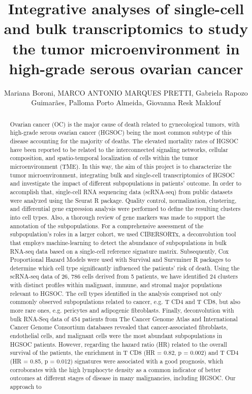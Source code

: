 \documentclass[twoside]{article}
\title{\vspace{-15mm}\fontsize{24pt}{10pt}\selectfont\textbf{ Integrative analyses of single-cell and bulk transcriptomics to study the tumor microenvironment in high-grade serous ovarian cancer }} %
\author{ Mariana Boroni,  MARCO ANTONIO MARQUES PRETTI,  Gabriela Rapozo Guimar\~aes,  Palloma Porto Almeida,  Giovanna Resk Maklouf }
\affil{ INCA - Instituto Nacional de C\^ancer,  Instituto Nacional de C\^ancer }
\date{}
\begin{document}
  
  
  \maketitle %
  
  
  \thispagestyle{fancy} %
  
  
  \begin{abstract}
  Ovarian cancer (OC) is the major cause of death related to gynecological tumors,  with high-grade serous ovarian cancer (HGSOC) being the most common subtype of this disease accounting for the majority of deaths. The elevated mortality rates of HGSOC have been reported to be related to the interconnected signaling networks,  cellular composition,  and spatio-temporal localization of cells within the tumor microenvironment (TME). In this way,  the aim of this project is to characterize the tumor microenvironment,  integrating bulk and single-cell transcriptomics of HGSOC and investigate the impact of different subpopulations in patients’ outcome. In order to accomplish that,  single-cell RNA sequencing data (scRNA-seq) from public datasets were analyzed using the Seurat R package. Quality control,  normalization,  clustering,  and differential gene expression analysis were performed to define the resulting clusters into cell types. Also,  a thorough review of gene markers was made to support the annotation of the subpopulations. For a comprehensive assessment of the subpopulation’s roles in a larger cohort,  we used CIBERSORTx,  a deconvolution tool that employs machine-learning to detect the abundance of subpopulations in bulk RNA-seq data based on a single-cell reference signature matrix. Subsequently,  Cox Proportional Hazard Models were used with Survival and Survminer R packages to determine which cell type significantly influenced the patients' risk of death. Using the scRNA-seq data of 26, 786 cells derived from 5 patients,  we have identified 24 clusters with distinct profiles within malignant,  immune,  and stromal major populations relevant to HGSOC. The cell types identified in the analysis comprised not only commonly observed subpopulations related to cancer,  e.g. T CD4 and T CD8,  but also more rare ones,  e.g. pericytes and adipogenic fibroblasts. Finally,  deconvolution with bulk RNA-Seq data of 454 patients from The Cancer Genome Atlas and International Cancer Genome Consortium databases revealed that cancer-associated fibroblasts,  endothelial cells,  and malignant cells were the most abundant subpopulations in HGSOC patients. However,  regarding the hazard ratio (HR) related to the overall survival of the patients,  the enrichment in T CD8 (HR = 0.82,  p = 0.002) and T CD4  (HR = 0.85,  p = 0.012) signatures were associated with a good prognosis,  which corroborates with the high lymphocyte density as a common indicator of better outcomes at different stages of disease in many malignancies,  including HGSOC.  Our approach to 
\end{abstract}
\end{document}
